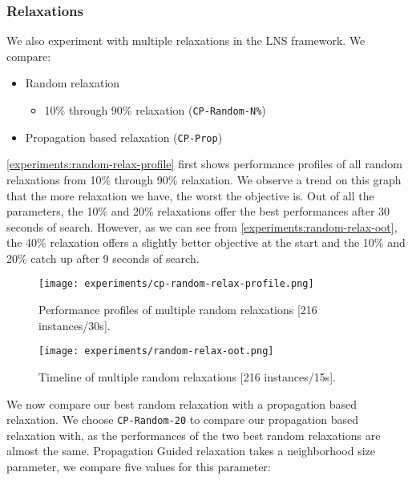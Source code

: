 \documentclass[../../thesis.tex]{subfiles}
\begin{document}
\subsubsection{Relaxations}

We also experiment with multiple relaxations in the LNS framework. We compare:

\begin{itemize}
  \item Random relaxation 
    \begin{itemize}
      \item 10\% through 90\% relaxation (\texttt{CP-Random-N\%})
    \end{itemize}
  \item Propagation based relaxation (\texttt{CP-Prop})
\end{itemize}

\autoref{experiments:random-relax-profile} first shows performance profiles of all random relaxations 
from 10\% through 90\% relaxation. We observe a trend on this graph that the more relaxation we have,
the worst the objective is. Out of all the parameters, the 10\% and 20\% relaxations offer the best performances after 30 seconds of search. However, as we can see from \autoref{experiments:random-relax-oot}, the 40\% relaxation 
offers a slightly better objective at the start and the 10\% and 20\% catch up after 9 seconds of search.


\begin{figure}[H]
  \centering
  \texttt{[image: experiments/cp-random-relax-profile.png]}
  \caption{Performance profiles of multiple random relaxations [216 instances/30s].}
  \label{experiments:random-relax-profile}
\end{figure}

\begin{figure}[H]
  \centering
  \texttt{[image: experiments/random-relax-oot.png]}
  \caption{Timeline of multiple random relaxations [216 instances/15s].}
  \label{experiments:random-relax-oot}
\end{figure}


We now compare our best random relaxation with a propagation based relaxation.
We choose \texttt{CP-Random-20} to compare our propagation based relaxation with, as the performances of 
the two best random relaxations are almost the same.
Propagation Guided relaxation takes a neighborhood size parameter, we compare five values for this parameter:
\end{document}
